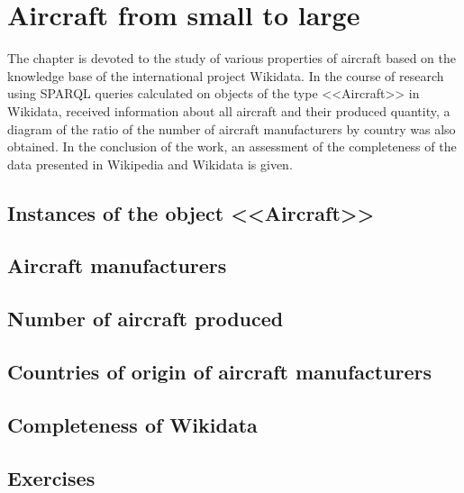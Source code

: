\setchapterpreamble[u]{\margintoc}
\chapter{Aircraft from small to large}

The chapter is devoted to the study of various properties of aircraft
based on the knowledge base of the international project Wikidata.
In the course of research using SPARQL queries calculated on objects of the type <<Aircraft>> in Wikidata,
received information about all aircraft and their produced quantity,
a diagram of the ratio of the number of aircraft manufacturers by country was also obtained.
In the conclusion of the work, an assessment of the completeness of the data presented in Wikipedia and Wikidata is given.


\section{Instances of the object <<Aircraft>>}


\section{Aircraft manufacturers}


\section{Number of aircraft produced}


\section{Countries of origin of aircraft manufacturers}


\section{Completeness of Wikidata}


\section{Exercises}
